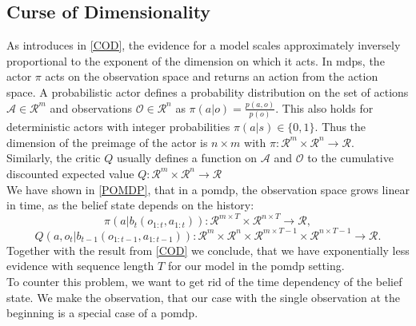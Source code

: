 \subsection{Curse of Dimensionality}
\label{COD_AC}
As introduces in \ref{COD}, the evidence for a model scales approximately inversely proportional to the exponent of the dimension on which it acts. In \ac{mdp}s, the 
actor $\pi$ acts on the observation space and returns an action from the action space. A probabilistic actor defines a probability distribution on the set 
of actions $\mathcal{A} \in \mathcal{R}^m$ and observations $\mathcal{O} \in \mathcal{R}^n$ as $\pi(a|o) = \frac{p(a,o)}{p(o)}$. This also holds for 
deterministic actors with integer probabilities $\pi(a|s) \in \{0,1\}$.
Thus the dimension of the preimage of the actor is $n \times m$ with $\pi:\mathcal{R}^m \times \mathcal{R}^n \rightarrow \mathcal{R}$.\\

Similarly, the critic $Q$ usually defines a function on $\mathcal{A}$ and $\mathcal{O}$ to the cumulative discounted expected value 
$Q:\mathcal{R}^m \times \mathcal{R}^n \rightarrow \mathcal{R}$\\
We have shown in \ref{POMDP}, that in a \ac{pomdp}, the observation space grows linear in time, as the belief state depends on the history: 
$$\pi(a| b_t(o_{1:t}, a_{1:t})):\mathcal{R}^{m \times T} \times \mathcal{R}^{n \times T} \rightarrow \mathcal{R},$$
$$Q(a, o_{t}| b_{t-1}(o_{1:t-1}, a_{1:t-1})):\mathcal{R}^{m} \times \mathcal{R}^{n} \times \mathcal{R}^{m \times T-1} \times \mathcal{R}^{n \times T-1} \rightarrow \mathcal{R}.$$
Together with the result from \ref{COD} we conclude, that we have 
exponentially less evidence with sequence length $T$ for our model in the \ac{pomdp} setting.\\

To counter this problem, we want to get rid of the time dependency of the belief state. 
We make the observation, that our case with the single observation at the beginning is a special case of a \ac{pomdp}.\\

